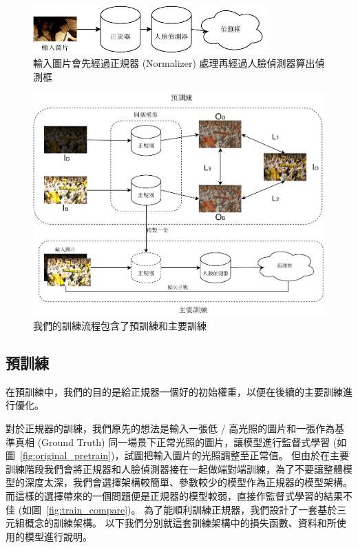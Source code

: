 \begin{figure}[htb]
\centering
\includegraphics[width=0.8\textwidth]{figures/test_flow}
\caption[測試時從輸入圖片到獲得偵測結果的流程]{輸入圖片會先經過正規器 (Normalizer) 處理再經過人臉偵測器算出偵測框}
\label{fig:test_flow}
\end{figure}

\begin{figure}[htb]
\centering
\includegraphics[width=1\textwidth]{figures/train_flow}
\caption[完整的訓練流程]{我們的訓練流程包含了預訓練和主要訓練}
\label{fig:train_flow}
\end{figure}

\subsection{預訓練}

在預訓練中，我們的目的是給正規器一個好的初始權重，以便在後續的主要訓練進行優化。

對於正規器的訓練，我們原先的想法是輸入一張低 / 高光照的圖片和一張作為基準真相 (Ground Truth) 同一場景下正常光照的圖片，讓模型進行監督式學習 (如圖~\ref{fig:original_pretrain})，試圖把輸入圖片的光照調整至正常值。
但由於在主要訓練階段我們會將正規器和人臉偵測器接在一起做端對端訓練，為了不要讓整體模型的深度太深，我們會選擇架構較簡單、參數較少的模型作為正規器的模型架構。而這樣的選擇帶來的一個問題便是正規器的模型較弱，直接作監督式學習的結果不佳 (如圖~\ref{fig:train_compare})。
為了能順利訓練正規器，我們設計了一套基於三元組概念的訓練架構。
以下我們分別就這套訓練架構中的損失函數、資料和所使用的模型進行說明。

